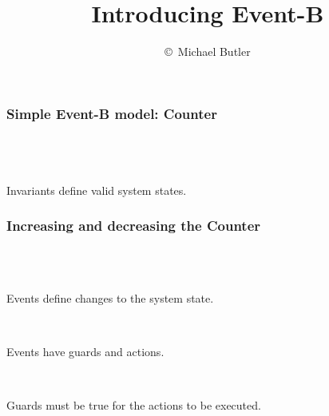 \documentclass{beamer}
\title{Introducing Event-B}
\author{\copyright\ Michael Butler}
\institute{ University of Southampton }
\begin{document}
\begin{frame}

\titlepage

\end{frame}




\begin{frame}


\frametitle{Simple  Event-B model: Counter }

\ENDC\\

~\\

 \\

Invariants define \alert{valid} system states.



\end{frame}





\begin{frame}

\frametitle{Increasing and decreasing the Counter }


\operations

\begin{columns}
\begin{column}{2in}
\end{column}
\begin{column}{2in}
\end{column}
\end{columns}

~\\

~\\

Events define \alert{changes} to the system state.

~

Events have \alert{guards} and \alert{actions}.

~

Guards must be true for the actions to be executed.


\end{frame}
\end{document}
